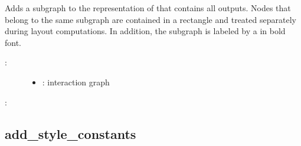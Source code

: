 \documentclass[letterpaper,10pt,english]{sphinxmanual}
\begin{document}
\begin{fulllineitems}
\label{\detokenize{InteractionGraphs:PyBoolNet.InteractionGraphs.add_style_outputs}}
Adds a subgraph to the  representation of  that contains all outputs.
Nodes that belong to the same  subgraph are contained in a rectangle and treated separately during layout computations.
In addition, the subgraph is labeled by a  in bold font.
\begin{description}
\item[{:}] \leavevmode\begin{itemize}
\item {} 
: interaction graph

\end{itemize}

\end{description}

:

\begin{sphinxVerbatim}[commandchars=\\\{\}]
\end{sphinxVerbatim}

\end{fulllineitems}



\subsection{add\_style\_constants}
\label{\detokenize{InteractionGraphs:id13}}\label{\detokenize{InteractionGraphs:add-style-constants}}
\end{document}
